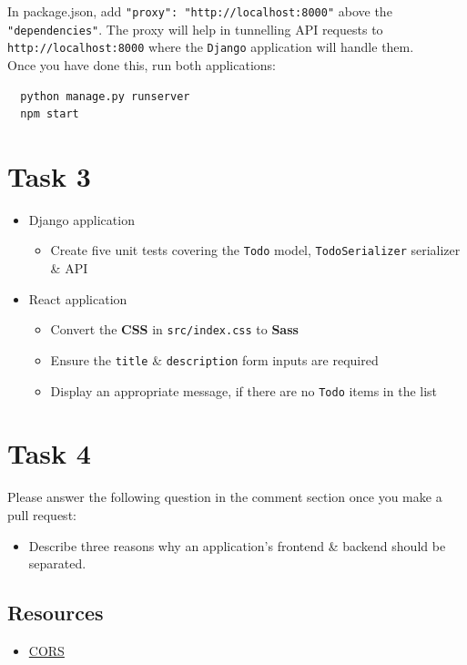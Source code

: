 \documentclass{article}
\begin{document}
In package.json, add \texttt{"proxy": "http://localhost:8000"} above the \texttt{"dependencies"}. The proxy will help in tunnelling API requests to \texttt{http://localhost:8000} where the \texttt{Django} application will handle them. \\

Once you have done this, run both applications:

\begin{verbatim}
  python manage.py runserver
  npm start
\end{verbatim}

\section*{Task 3} 
\begin{itemize}
  \item Django application
  \begin{itemize}
    \item Create five unit tests covering the \texttt{Todo} model, \texttt{TodoSerializer} serializer \& API
  \end{itemize}
  \item React application
  \begin{itemize}
    \item Convert the \textbf{CSS} in \texttt{src/index.css} to \textbf{Sass}
    \item Ensure the \texttt{title} \& \texttt{description} form inputs are required
    \item Display an appropriate message, if there are no \texttt{Todo} items in the list
  \end{itemize}
\end{itemize} 

\section*{Task 4} 
Please answer the following question in the comment section once you make a pull request:
\begin{itemize}
  \item Describe three reasons why an application's frontend \& backend should be separated.
\end{itemize} 

\subsection*{Resources} 
\begin{itemize}
  \item \href{https://developer.mozilla.org/en-US/docs/Web/HTTP/CORS}{CORS}
\end{itemize}
 
\end{document}
